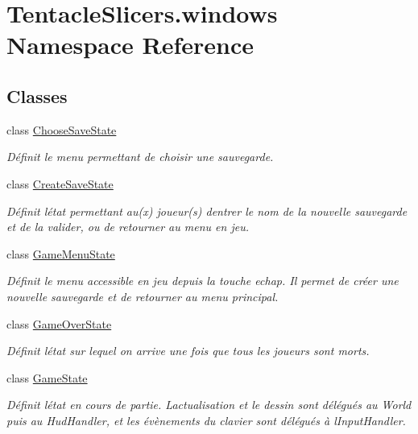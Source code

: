 \hypertarget{namespace_tentacle_slicers_1_1windows}{}\section{Tentacle\+Slicers.\+windows Namespace Reference}
\label{namespace_tentacle_slicers_1_1windows}
\subsection*{Classes}
\begin{DoxyCompactItemize}
\item 
class \hyperlink{class_tentacle_slicers_1_1windows_1_1_choose_save_state}{Choose\+Save\+State}
\begin{DoxyCompactList}\small\item\em Définit le menu permettant de choisir une sauvegarde. \end{DoxyCompactList}\item 
class \hyperlink{class_tentacle_slicers_1_1windows_1_1_create_save_state}{Create\+Save\+State}
\begin{DoxyCompactList}\small\item\em Définit l\textquotesingle{}état permettant au(x) joueur(s) d\textquotesingle{}entrer le nom de la nouvelle sauvegarde et de la valider, ou de retourner au menu en jeu. \end{DoxyCompactList}\item 
class \hyperlink{class_tentacle_slicers_1_1windows_1_1_game_menu_state}{Game\+Menu\+State}
\begin{DoxyCompactList}\small\item\em Définit le menu accessible en jeu depuis la touche echap. Il permet de créer une nouvelle sauvegarde et de retourner au menu principal. \end{DoxyCompactList}\item 
class \hyperlink{class_tentacle_slicers_1_1windows_1_1_game_over_state}{Game\+Over\+State}
\begin{DoxyCompactList}\small\item\em Définit l\textquotesingle{}état sur lequel on arrive une fois que tous les joueurs sont morts. \end{DoxyCompactList}\item 
class \hyperlink{class_tentacle_slicers_1_1windows_1_1_game_state}{Game\+State}
\begin{DoxyCompactList}\small\item\em Définit l\textquotesingle{}état en cours de partie. L\textquotesingle{}actualisation et le dessin sont délégués au World puis au Hud\+Handler, et les évènements du clavier sont délégués à l\textquotesingle{}Input\+Handler. \end{DoxyCompactList}\item 

\end{DoxyCompactItemize}
